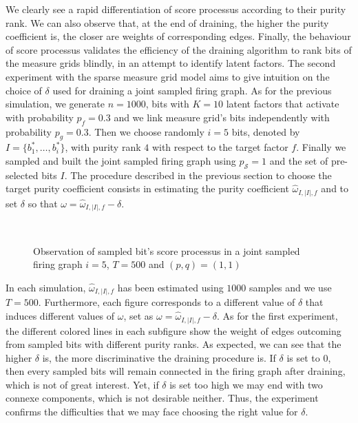 \documentclass[a4paper, 11pt]{article}
\begin{document}
We clearly see a rapid differentiation of score processus according to their purity rank. We can also observe that, at the end of draining, the higher the purity coefficient is, the closer are weights of corresponding edges. Finally, the behaviour of score processus validates the efficiency of the draining algorithm to rank bits of the measure grids blindly, in an attempt to identify latent factors. The second experiment with the sparse measure grid model aims to give intuition on the choice of $\delta$ used for draining a joint sampled firing graph. As for the previous simulation, we generate $n=1000$, bits with $K=10$ latent factors that activate with probability $p_f = 0.3$ and we link measure grid's bits independently with probability $p_g=0.3$. Then we choose randomly $i=5$ bits, denoted by $I=\{b_1^{*}, \ldots, b_i^{*}\}$, with purity rank $4$ with respect to the target factor $f$. Finally we sampled and built the joint sampled firing graph using $p_{\mathcal{S}} = 1$ and the set of pre-selected bits $I$. The procedure described in the previous section to choose the target purity coefficient consists in estimating the purity coefficient $\hat{\omega}_{I, \vert I \vert, f}$ and to set $\delta$ so that $\omega = \hat{\omega}_{I, \vert I \vert, f} - \delta$.\\

\begin{figure}[H]
\\
\caption{Observation of sampled bit's score processus in a joint sampled firing graph $i=5$, $T=500$ and $(p, q) = (1, 1)$}
\label{fig:sim_si_2}
\end{figure}

In each simulation, $\hat{\omega}_{I, \vert I \vert, f}$ has been estimated using $1000$ samples and we use $T=500$. Furthermore, each figure corresponds to a different value of $\delta$ that induces different values of $\omega$, set as $\omega = \hat{\omega}_{I, \vert I \vert, f} - \delta$. As for the first experiment, the different colored lines in each subfigure show the weight of edges outcoming from sampled bits with different purity ranks. As expected, we can see that the higher $\delta$ is, the more discriminative the draining procedure is.  If $\delta$ is set to 0, then every sampled bits will remain connected in the firing graph after draining, which is not of great interest. Yet, if $\delta$ is set too high we may end with two connexe components, which is not desirable neither. Thus, the experiment confirms the difficulties that we may face choosing the right value for $\delta$.
\end{document}
